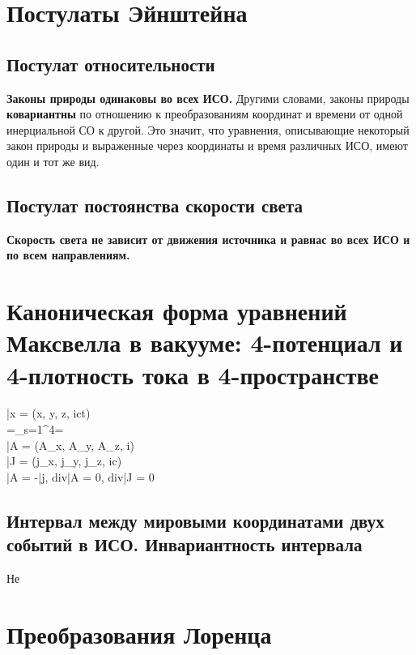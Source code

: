 


	\small
	\begin{multicols*}{5}
		\section{Постулаты Эйнштейна}
		\subsection{Постулат относительности}
		\textbf{Законы природы одинаковы во всех ИСО.} Другими словами, законы природы \textbf{ковариантны} по отношению к преобразованиям координат и времени от одной инерциальной СО к другой. Это значит, что уравнения, описывающие некоторый закон природы и выраженные через координаты и время различных ИСО, имеют один и тот же вид.
		\subsection{Постулат постоянства скорости света}
		\textbf{Скорость света не зависит от движения источника и равнас во всех ИСО и по всем направлениям.}
		
		\section{Каноническая форма уравнений Максвелла в вакууме: 4-потенциал и 4-плотность тока в 4-пространстве}
		\begin{fralign*}
			\bar{x} = \left(x, y, z, ict\right) \\
			\Delta {}=\sum\limits_{s=1}^4=\Box  \\
			\bar{A} = \left(A_x, A_y, A_z, i\phi\right)  \\ 
			\bar{J} = \left(j_x, j_y, j_z, ic\rho\right)   \\
			\Box \bar{A} = -\bar{j}, div{\bar{A}} = 0, div{\bar{J}} = 0 
		\end{fralign*}
		
		\subsection*{Интервал между мировыми координатами двух событий в ИСО. Инвариантность интервала}
		Не
		\section{Преобразования Лоренца}

\end{multicols*}
